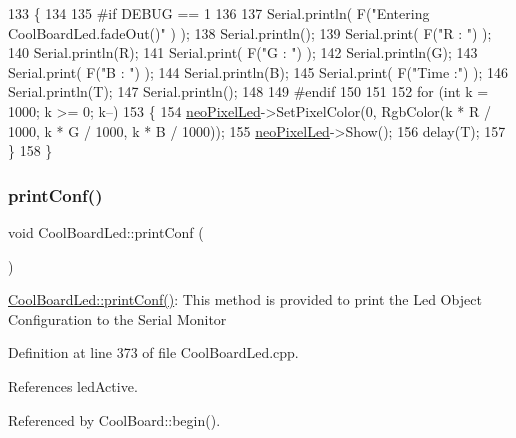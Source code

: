 \begin{DoxyCode}
133 \{
134 
135 \textcolor{preprocessor}{#if DEBUG == 1 }
136 
137     Serial.println( F(\textcolor{stringliteral}{"Entering CoolBoardLed.fadeOut()"} ) );
138     Serial.println();
139     Serial.print( F(\textcolor{stringliteral}{"R : "}) );
140     Serial.println(R);
141     Serial.print( F(\textcolor{stringliteral}{"G : "}) );
142     Serial.println(G);
143     Serial.print( F(\textcolor{stringliteral}{"B : "}) );
144     Serial.println(B);
145     Serial.print( F(\textcolor{stringliteral}{"Time :"}) );
146     Serial.println(T);
147     Serial.println();
148 
149 \textcolor{preprocessor}{#endif  }
150 
151 
152     \textcolor{keywordflow}{for} (\textcolor{keywordtype}{int} k = 1000; k >= 0; k--) 
153     \{
154         \hyperlink{classCoolBoardLed_ac2c13fa462a010cd9242bf297c013923}{neoPixelLed}->SetPixelColor(0, RgbColor(k * R / 1000, k * G / 1000, k * B / 1000));
155         \hyperlink{classCoolBoardLed_ac2c13fa462a010cd9242bf297c013923}{neoPixelLed}->Show();
156         delay(T);
157     \}
158 \}
\end{DoxyCode}
\mbox{\label{classCoolBoardLed_a8ed3053a36f0ed4a131f43b5b17efb61}} 
\subsubsection{\texorpdfstring{print\+Conf()}{printConf()}}
{\footnotesize\ttfamily void Cool\+Board\+Led\+::print\+Conf (\begin{DoxyParamCaption}{ }\end{DoxyParamCaption})}

\hyperlink{classCoolBoardLed_a8ed3053a36f0ed4a131f43b5b17efb61}{Cool\+Board\+Led\+::print\+Conf()}\+: This method is provided to print the Led Object Configuration to the Serial Monitor 

Definition at line 373 of file Cool\+Board\+Led.\+cpp.



References led\+Active.



Referenced by Cool\+Board\+::begin().


